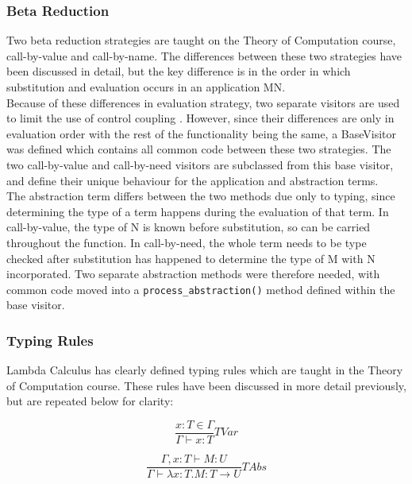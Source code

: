 \documentclass[a4paper,11pt]{report}
\begin{document}
\subsubsection{Beta Reduction}

Two beta reduction strategies are taught on the Theory of Computation course, call-by-value and call-by-name. The differences between these two strategies have been discussed in detail, but the key difference is in the order in which substitution and evaluation occurs in an application MN.\\

Because of these differences in evaluation strategy, two separate visitors are used to limit the use of control coupling \cite{Lethbridge2004}. However, since their differences are only in evaluation order with the rest of the functionality being the same, a BaseVisitor was defined which contains all common code between these two strategies. The two call-by-value and call-by-need visitors are subclassed from this base visitor, and define their unique behaviour for the application and abstraction terms.\\

The abstraction term differs between the two methods due only to typing, since determining the type of a term happens during the evaluation of that term. In call-by-value, the type of N is known before substitution, so can be carried throughout the function. In call-by-need, the whole term needs to be type checked after substitution has happened to determine the type of M with N incorporated. Two separate abstraction methods were therefore needed, with common code moved into a \texttt{process_abstraction()} method defined within the base visitor.

\subsubsection{Typing Rules}

Lambda Calculus has clearly defined typing rules which are taught in the Theory of Computation course. These rules have been discussed in more detail previously, but are repeated below for clarity:

\begin{equation*}
\frac{x:T\in \Gamma}{\Gamma \vdash x:T}TVar
\end{equation*}

\begin{equation*}
\frac{\Gamma ,x:T\vdash M:U}{\Gamma \vdash \lambda x:T.M:T \to U}TAbs
\end{equation*}
\end{document}
